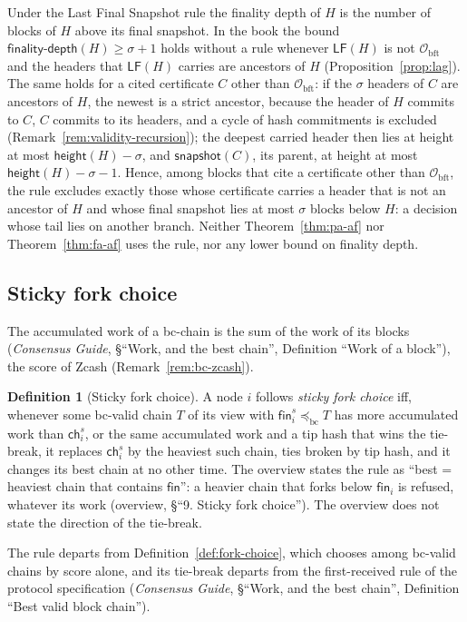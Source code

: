 \documentclass[11pt,a4paper]{article}
\theoremstyle{definition}
\newtheorem{definition}[theorem]{Definition}
\newcommand{\bc}{\mathrm{bc}}
\newcommand{\bft}{\mathrm{bft}}
\newcommand{\Origin}{\mathcal{O}}
\newcommand{\Obft}{\Origin_{\bft}}
\newcommand{\preceqbc}{\preceq_{\bc}}
\newcommand{\ch}{\mathsf{ch}}
\newcommand{\snapshot}{\mathsf{snapshot}}
\newcommand{\LF}{\mathsf{LF}}
\newcommand{\finalitydepth}{\mathsf{finality\text{-}depth}}
\newcommand{\fin}{\mathsf{fin}}
\begin{document}
Under the Last Final Snapshot rule the finality depth of $H$ is the number
of blocks of $H$ above its final snapshot. In the book the bound
$\finalitydepth(H) \ge \sigma + 1$ holds without a rule whenever $\LF(H)$
is not $\Obft$ and the headers that $\LF(H)$ carries are ancestors of $H$
(Proposition~\ref{prop:lag}). The same holds for a cited certificate $C$
other than $\Obft$: if the $\sigma$ headers of $C$ are ancestors of $H$, the
newest is a strict ancestor, because the header of $H$ commits to $C$, $C$
commits to its headers, and a cycle of hash commitments is excluded
(Remark~\ref{rem:validity-recursion}); the deepest carried header then lies
at height at most $\mathsf{height}(H) - \sigma$, and $\snapshot(C)$, its
parent, at height at most $\mathsf{height}(H) - \sigma - 1$. Hence, among
blocks that cite a certificate other than $\Obft$, the rule excludes
exactly those whose certificate carries a header that is not an ancestor of $H$
and whose final snapshot lies at most $\sigma$ blocks below $H$: a decision
whose tail lies on another branch. Neither Theorem~\ref{thm:pa-af} nor
Theorem~\ref{thm:fa-af} uses the rule, nor any lower bound on finality
depth.

\subsection{Sticky fork choice}\label{sec:sl-forkchoice}

The accumulated work of a bc-chain is the sum of the work of its blocks
(\emph{Consensus Guide}, \S``Work, and the best chain'', Definition ``Work
of a block''), the score of Zcash (Remark~\ref{rem:bc-zcash}).

\begin{definition}[Sticky fork choice]\label{def:sticky}
A node $i$ follows \emph{sticky fork choice} iff, whenever some bc-valid
chain $T$ of its view with $\fin_i^s \preceqbc T$ has more accumulated work
than $\ch_i^s$, or the same accumulated work and a tip hash that wins the
tie-break, it replaces $\ch_i^s$ by the heaviest such chain, ties broken by
tip hash, and it changes its best chain at no other time. The overview
states the rule as ``best = heaviest chain that contains $\fin$'': a heavier
chain that forks below $\fin_i$ is refused, whatever its work (overview, \S``9.
Sticky fork choice''). The overview does not state the direction of the
tie-break.
\end{definition}

The rule departs from Definition~\ref{def:fork-choice}, which chooses among
bc-valid chains by score alone, and its tie-break departs from the
first-received rule of the protocol specification (\emph{Consensus Guide},
\S``Work, and the best chain'', Definition ``Best valid block chain'').
\end{document}
